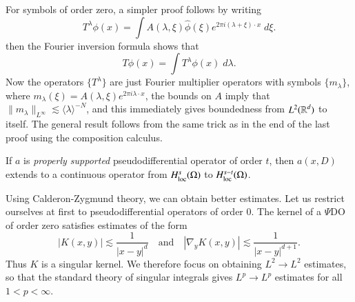 \begin{remark}
    For symbols of order zero, a simpler proof follows by writing
    \[ T^\lambda \phi(x) = \int A(\lambda, \xi) \widehat{\phi}(\xi) e^{2 \pi i (\lambda + \xi) \cdot x}\; d\xi. \]
    then the Fourier inversion formula shows that
    \[ T \phi(x) = \int T^\lambda \phi(x)\; d\lambda. \]
    Now the operators $\{ T^\lambda \}$ are just Fourier multiplier operators with symbols $\{ m_\lambda \}$, where $m_\lambda(\xi) = A(\lambda, \xi) e^{2 \pi i \lambda \cdot x}$, the bounds on $A$ imply that $\| m_\lambda \|_{L^\infty} \lesssim \langle \lambda \rangle^{-N}$, and this immediately gives boundedness from $L^2(\operatorname{\mathbb{R}}^d)$ to itself. The general result follows from the same trick as in the end of the last proof using the composition calculus.
\end{remark}

\begin{remark}
    If $a$ is \emph{properly supported} pseudodifferential operator of order $t$, then $a(x,D)$ extends to a continuous operator from $H^s_{\text{loc}}(\Omega)$ to $H^{s-t}_{\text{loc}}(\Omega)$.
\end{remark}

Using Calderon-Zygmund theory, we can obtain better estimates. Let us restrict ourselves at first to pseudodifferential operators of order $0$. The kernel of a $\Psi$DO of order zero satisfies estimates of the form
%
\[ |K(x,y)| \lesssim \frac{1}{|x - y|^d} \quad\text{and}\quad |\nabla_y K(x,y)| \lesssim \frac{1}{|x - y|^{d+1}}. \]
%
Thus $K$ is a singular kernel. We therefore focus on obtaining $L^2 \to L^2$ estimates, so that the standard theory of singular integrals gives $L^p \to L^p$ estimates for all $1 < p < \infty$.


